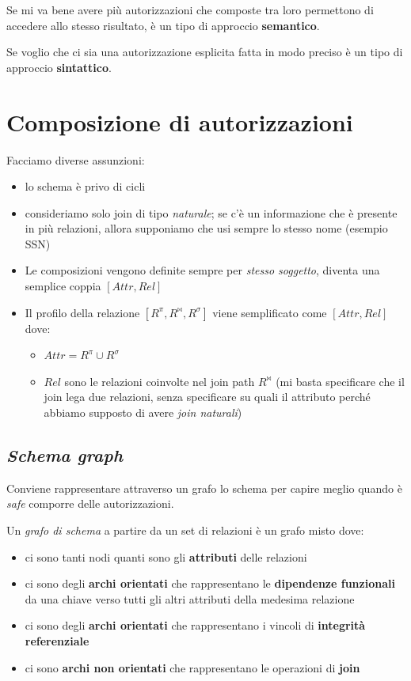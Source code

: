 \documentclass{report}
\begin{document}
\noindent Se mi va bene avere più autorizzazioni che composte tra loro permettono di accedere allo stesso risultato, è un tipo di approccio \textbf{semantico}.

\noindent Se voglio che ci sia una autorizzazione esplicita fatta in modo preciso è un tipo di approccio \textbf{sintattico}.


\chapter{Composizione di autorizzazioni}
Facciamo diverse assunzioni:
\begin{itemize}
    \item lo schema è privo di cicli 
    \item consideriamo solo join di tipo \textit{naturale}; se c'è un informazione che è presente in più relazioni, allora supponiamo 
    che usi sempre lo stesso nome (esempio SSN)
    \item Le composizioni vengono definite sempre per \textit{stesso soggetto}, diventa una semplice coppia $[Attr, Rel]$
    \item Il profilo della relazione $[R^\pi, R^{\bowtie}, R^\sigma]$ viene semplificato come $[Attr, Rel]$ dove:
    \begin{itemize}
        \item $Attr = R^\pi \cup R^\sigma$
        \item $Rel$ sono le relazioni coinvolte nel join path $R^{\bowtie}$ (mi basta specificare che il join lega due relazioni, senza specificare 
        su quali il attributo perché abbiamo supposto di avere \textit{join naturali})
    \end{itemize}
\end{itemize}

\section{\textit{Schema graph}}
Conviene rappresentare attraverso un grafo lo schema per capire meglio quando è \textit{safe} comporre delle autorizzazioni.

\noindent Un \textit{grafo di schema} a partire da un set di relazioni è un grafo misto dove:
\begin{itemize}
    \item ci sono tanti nodi quanti sono gli \textbf{attributi} delle relazioni
    \item ci sono degli \textbf{archi orientati} che rappresentano le \textbf{dipendenze funzionali} da una chiave verso tutti gli altri attributi della medesima relazione
    \item ci sono degli \textbf{archi orientati} che rappresentano i vincoli di \textbf{integrità referenziale}
    \item ci sono \textbf{archi non orientati} che rappresentano le operazioni di \textbf{join}
\end{itemize}
\end{document}

